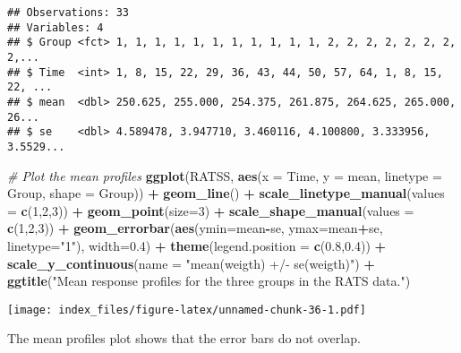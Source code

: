 \documentclass[]{article}
\newenvironment{Shaded}{\begin{snugshade}}{\end{snugshade}}
\newcommand{\KeywordTok}[1]{\textcolor[rgb]{0.13,0.29,0.53}{\textbf{#1}}}
\newcommand{\DataTypeTok}[1]{\textcolor[rgb]{0.13,0.29,0.53}{#1}}
\newcommand{\DecValTok}[1]{\textcolor[rgb]{0.00,0.00,0.81}{#1}}
\newcommand{\FloatTok}[1]{\textcolor[rgb]{0.00,0.00,0.81}{#1}}
\newcommand{\StringTok}[1]{\textcolor[rgb]{0.31,0.60,0.02}{#1}}
\newcommand{\CommentTok}[1]{\textcolor[rgb]{0.56,0.35,0.01}{\textit{#1}}}
\newcommand{\OperatorTok}[1]{\textcolor[rgb]{0.81,0.36,0.00}{\textbf{#1}}}
\newcommand{\NormalTok}[1]{#1}
\begin{document}
\begin{verbatim}
## Observations: 33
## Variables: 4
## $ Group <fct> 1, 1, 1, 1, 1, 1, 1, 1, 1, 1, 1, 2, 2, 2, 2, 2, 2, 2, 2,...
## $ Time  <int> 1, 8, 15, 22, 29, 36, 43, 44, 50, 57, 64, 1, 8, 15, 22, ...
## $ mean  <dbl> 250.625, 255.000, 254.375, 261.875, 264.625, 265.000, 26...
## $ se    <dbl> 4.589478, 3.947710, 3.460116, 4.100800, 3.333956, 3.5529...
\end{verbatim}

\begin{Shaded}
\begin{Highlighting}[]
\CommentTok{# Plot the mean profiles}
\KeywordTok{ggplot}\NormalTok{(RATSS, }\KeywordTok{aes}\NormalTok{(}\DataTypeTok{x =}\NormalTok{ Time, }\DataTypeTok{y =}\NormalTok{ mean, }\DataTypeTok{linetype =}\NormalTok{ Group, }\DataTypeTok{shape =}\NormalTok{ Group)) }\OperatorTok{+}
\StringTok{  }\KeywordTok{geom_line}\NormalTok{() }\OperatorTok{+}
\StringTok{  }\KeywordTok{scale_linetype_manual}\NormalTok{(}\DataTypeTok{values =} \KeywordTok{c}\NormalTok{(}\DecValTok{1}\NormalTok{,}\DecValTok{2}\NormalTok{,}\DecValTok{3}\NormalTok{)) }\OperatorTok{+}
\StringTok{  }\KeywordTok{geom_point}\NormalTok{(}\DataTypeTok{size=}\DecValTok{3}\NormalTok{) }\OperatorTok{+}
\StringTok{  }\KeywordTok{scale_shape_manual}\NormalTok{(}\DataTypeTok{values =} \KeywordTok{c}\NormalTok{(}\DecValTok{1}\NormalTok{,}\DecValTok{2}\NormalTok{,}\DecValTok{3}\NormalTok{)) }\OperatorTok{+}
\StringTok{  }\KeywordTok{geom_errorbar}\NormalTok{(}\KeywordTok{aes}\NormalTok{(}\DataTypeTok{ymin=}\NormalTok{mean}\OperatorTok{-}\NormalTok{se, }\DataTypeTok{ymax=}\NormalTok{mean}\OperatorTok{+}\NormalTok{se, }\DataTypeTok{linetype=}\StringTok{"1"}\NormalTok{), }\DataTypeTok{width=}\FloatTok{0.4}\NormalTok{) }\OperatorTok{+}
\StringTok{  }\KeywordTok{theme}\NormalTok{(}\DataTypeTok{legend.position =} \KeywordTok{c}\NormalTok{(}\FloatTok{0.8}\NormalTok{,}\FloatTok{0.4}\NormalTok{)) }\OperatorTok{+}
\StringTok{  }\KeywordTok{scale_y_continuous}\NormalTok{(}\DataTypeTok{name =} \StringTok{"mean(weigth) +/- se(weigth)"}\NormalTok{) }\OperatorTok{+}
\StringTok{  }\KeywordTok{ggtitle}\NormalTok{(}\StringTok{"Mean response profiles for the three groups in the RATS data."}\NormalTok{)}
\end{Highlighting}
\end{Shaded}

\texttt{[image: index\_files/figure-latex/unnamed-chunk-36-1.pdf]}

The mean profiles plot shows that the error bars do not overlap.
\end{document}
